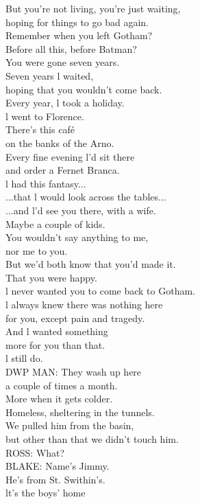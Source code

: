 \documentclass{article}
\begin{document}
\begin{multicols}{3}
But you're not living, you're just waiting,\\
hoping for things to go bad again.\\
Remember when you left Gotham?\\
Before all this, before Batman?\\
You were gone seven years.\\
Seven years l waited,\\
hoping that you wouldn't come back.\\
Every year, l took a holiday.\\
l went to Florence.\\
There's this café\\
on the banks of the Arno.\\
Every fine evening l'd sit there\\
and order a Fernet Branca.\\
l had this fantasy...\\
...that l would look across the tables...\\
...and l'd see you there, with a wife.\\
Maybe a couple of kids.\\
You wouldn't say anything to me,\\
nor me to you.\\
But we'd both know that you'd made it.\\
That you were happy.\\
l never wanted you to come back to Gotham.\\
l always knew there was nothing here\\
for you, except pain and tragedy.\\
And l wanted something\\
more for you than that.\\
l still do.\\
DWP MAN: They wash up here\\
a couple of times a month.\\
More when it gets colder.\\
Homeless, sheltering in the tunnels.\\
We pulled him from the basin,\\
but other than that we didn't touch him.\\
ROSS: What?\\
BLAKE: Name's Jimmy.\\
He's from St. Swithin's.\\
lt's the boys' home\\

\end{multicols}
\end{document}
